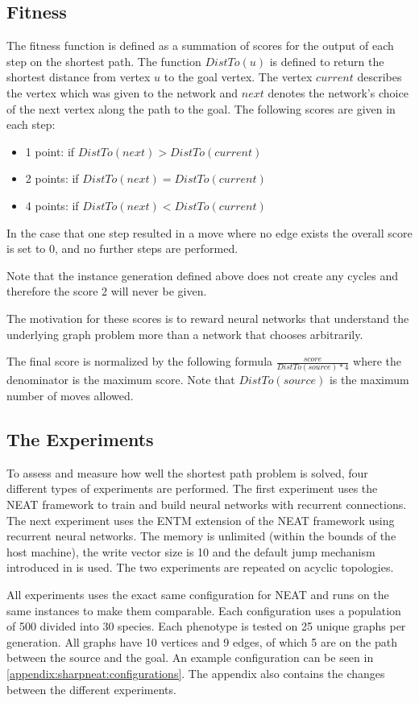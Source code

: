 \subsection{Fitness}
The fitness function is defined as a summation of scores for the output of each step on the shortest path. The function $ DistTo(u) $ is defined to return the shortest distance from vertex $ u $ to the goal vertex. The vertex $ current $ describes the vertex which was given to the network and $ next $ denotes the network's choice of the next vertex along the path to the goal. The following scores are given in each step:

\begin{itemize}
	\item[] 1 point: if $ DistTo(next) > DistTo(current) $
	\item[] 2 points: if $ DistTo(next) = DistTo(current) $
	\item[] 4 points: if $ DistTo(next) < DistTo(current) $
\end{itemize}

\noindent In the case that one step resulted in a move where no edge exists the overall score is set to 0, and no further steps are performed. 

Note that the instance generation defined above does not create any cycles and therefore the score 2 will never be given.

\newpar The motivation for these scores is to reward neural networks that understand the underlying graph problem more than a network that chooses arbitrarily.

\newpar The final score is normalized by the following formula $ \frac{score}{DistTo(source)*4} $ where the denominator is the  maximum score. Note that $ DistTo(source) $ is the maximum number of moves allowed.

\subsection{The Experiments}
To assess and measure how well the shortest path problem is solved, four different types of experiments are performed. The first experiment uses the NEAT framework to train and build neural networks with recurrent connections. The next experiment uses the ENTM extension of the NEAT framework using recurrent neural networks. The memory is unlimited (within the bounds of the host machine), the write vector size is 10 and the default jump mechanism introduced in \cite{luders2017continual} is used. The two experiments are repeated on acyclic topologies.

\newpar All experiments uses the exact same configuration for NEAT and runs on the same instances to make them comparable. Each configuration uses a population of 500 divided into 30 species. Each phenotype is tested on 25 unique graphs per generation. All graphs have 10 vertices and 9 edges, of which 5 are on the path between the source and the goal. An example configuration can be seen in \autoref{appendix:sharpneat:configurations}. The appendix also contains the changes between the different experiments.